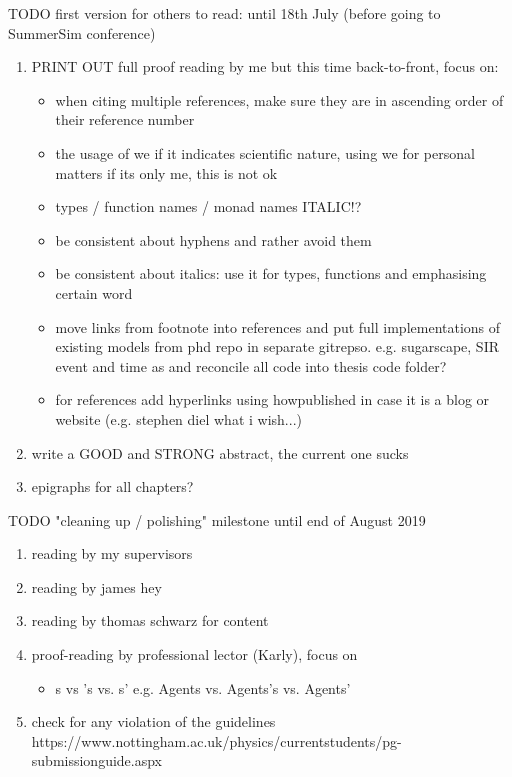 \documentclass[oneside]{book}
\begin{document}
TODO first version for others to read: until 18th July (before going to SummerSim conference)
\begin{enumerate}
	\item PRINT OUT full proof reading by me but this time back-to-front, focus on:
	\begin{itemize}
		\item when citing multiple references, make sure they are in ascending order of their reference number	
		\item the usage of we if it indicates scientific nature, using we for personal matters if its only me, this is not ok	
		\item types / function names / monad names ITALIC!?	
		\item be consistent about hyphens and rather avoid them
		\item be consistent about italics: use it for types, functions and emphasising certain word
		\item move links from footnote into references and put full implementations of existing models from phd repo in separate gitrepso. e.g. sugarscape, SIR event and time as and reconcile all code into thesis code folder?
		\item for references add hyperlinks using howpublished in case it is a blog or website (e.g. stephen diel what i wish...)	
	\end{itemize}
	
	\item write a GOOD and STRONG abstract, the current one sucks
	
	\item epigraphs for all chapters?
\end{enumerate}

TODO "cleaning up / polishing" milestone until end of August 2019
\begin{enumerate}
	\item reading by my supervisors

	\item reading by james hey
	
	\item reading by thomas schwarz for content
		
	\item proof-reading by professional lector (Karly), focus on 
	\begin{itemize}
		\item s vs 's vs. s' e.g. Agents vs. Agents's vs. Agents'
	\end{itemize}
	
	\item check for any violation of the guidelines https://www.nottingham.ac.uk/physics/currentstudents/pg-submissionguide.aspx
\end{enumerate}
\end{document}
